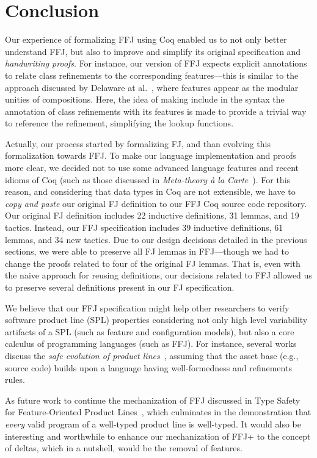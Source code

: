 \chapter{Conclusion}\label{seq:impl}

Our experience of formalizing \gls{FFJ} 
using Coq enabled us to 
not only better understand \gls{FFJ}, but also to improve and 
simplify its original specification and \emph{handwriting 
proofs}. For instance, our version of \gls{FFJ} expects 
explicit annotations to relate class refinements to the 
corresponding features---this is similar to the 
approach discussed by Delaware at al.~\cite{delaware:fse-2009}, 
where features appear as the modular unities of compositions. 
Here, the idea of making include in the syntax the annotation 
of class refinements with its features is made to provide a trivial way to 
reference the refinement, simplifying the lookup functions.

Actually, our process started by formalizing \gls{FJ}, 
and than evolving this formalization towards \gls{FFJ}. 
To make our language implementation and proofs more clear, 
we decided not to use some advanced language features 
and recent idioms of Coq (such as those discussed in \emph{Meta-theory \`{a} la Carte}~\cite{delaware:popl2013}). 
For this reason, and considering that data types in Coq are not extensible, 
we have to \emph{copy and paste} our original \gls{FJ} definition 
to our \gls{FFJ} Coq source code repository. Our original \gls{FJ} 
definition includes 22 inductive definitions, 31 lemmas, and 
19 tactics. Instead, our \gls{FFJ} specification includes 
39 inductive definitions, 61 lemmas, and 34 new tactics. Due to our 
design decisions detailed in the previous sections, 
we were able to preserve all \gls{FJ} lemmas in \gls{FFJ}---though 
we had to change the proofs related to four of the original \gls{FJ} 
lemmas. That is, even with the naive approach for reusing 
definitions, our decisions related to \gls{FFJ} 
allowed us to preserve several definitions present 
in our \gls{FJ} specification. 

We believe that our \gls{FFJ} specification might 
help other researchers to verify software product 
line (SPL) properties considering not only high level 
variability artifacts of a SPL (such as feature and configuration 
models), but also a core calculus of programming 
languages (such as \gls{FFJ}). For instance, 
several works discuss the \emph{safe evolution 
of product lines}~\cite{}, assuming that the asset 
base (e.g., source code) builds upon a 
language having well-formedness and 
refinements rules.  

As future work to continue the mechanization of \gls{FFJ} discussed in 
Type Safety for Feature-Oriented Product Lines~\cite{}, which culminates
in the demonstration that \emph{every} valid program of a well-typed product
line is well-typed. It would also be interesting and worthwhile to enhance our
mechanization of \gls{FFJ+} to the concept of deltas, which in a nutshell,
would be the removal of features.
